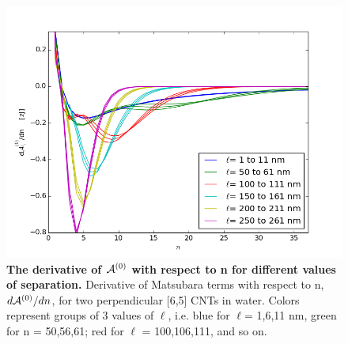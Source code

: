 \documentclass[a4paper]{article}
\begin{document}
\begin{center}
\hskip 73pt
\begin{figure}[t!]
\begin{center}
\includegraphics[width=1.2\textwidth,scale= 1.1]{plots/65_dAdn_vs_n.png}
\hskip 43pt
\caption{{\bf{The derivative of ${\cal A}^{(0)}$ with respect to n for different
    values of separation.}} Derivative of Matsubara terms with respect to n,
    $d{\cal A}^{(0)}/dn$, for two perpendicular [6,5] CNTs in water. Colors represent
groups of 3 values of $\ell$, i.e. blue for $\ell$= 1,6,11 nm, green for n =
50,56,61; red for $\ell$ = 100,106,111, and so on.}
\label{eiz65}
\end{center}
\end{figure} 
\end{center}
\end{document}

